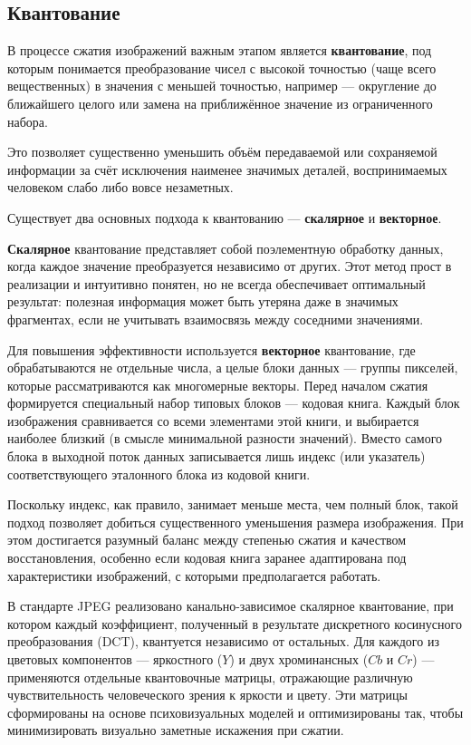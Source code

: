 \subsection{Квантование}

В процессе сжатия изображений важным этапом является \textbf{квантование}, 
под которым понимается преобразование чисел с высокой точностью (чаще всего вещественных) в значения с меньшей точностью, 
например — округление до ближайшего целого или замена на приближённое значение из ограниченного набора. 

Это позволяет существенно уменьшить объём передаваемой или сохраняемой информации за счёт исключения наименее значимых деталей, 
воспринимаемых человеком слабо либо вовсе незаметных.

Существует два основных подхода к квантованию — \textbf{скалярное} и \textbf{векторное}.

\textbf{Скалярное} квантование представляет собой поэлементную обработку данных, 
когда каждое значение преобразуется независимо от других. 
Этот метод прост в реализации и интуитивно понятен, но не всегда обеспечивает оптимальный результат: 
полезная информация может быть утеряна даже в значимых фрагментах, если не учитывать взаимосвязь между соседними значениями.

Для повышения эффективности используется \textbf{векторное} квантование, где обрабатываются не отдельные числа, 
а целые блоки данных — группы пикселей, которые рассматриваются как многомерные векторы. 
Перед началом сжатия формируется специальный набор типовых блоков — кодовая книга. 
Каждый блок изображения сравнивается со всеми элементами этой книги, и выбирается наиболее близкий (в смысле минимальной разности значений). 
Вместо самого блока в выходной поток данных записывается лишь индекс (или указатель) соответствующего эталонного блока из кодовой книги.

Поскольку индекс, как правило, занимает меньше места, чем полный блок, такой подход позволяет добиться существенного уменьшения размера изображения. 
При этом достигается разумный баланс между степенью сжатия и качеством восстановления, 
особенно если кодовая книга заранее адаптирована под характеристики изображений, с которыми предполагается работать.

В стандарте JPEG реализовано канально-зависимое скалярное квантование, при котором каждый коэффициент, 
полученный в результате дискретного косинусного преобразования (DCT), квантуется независимо от остальных. 
Для каждого из цветовых компонентов — яркостного ($Y$) и двух хроминансных ($Cb$ и $Cr$) — применяются отдельные квантовочные матрицы, 
отражающие различную чувствительность человеческого зрения к яркости и цвету. 
Эти матрицы сформированы на основе психовизуальных моделей и оптимизированы так, 
чтобы минимизировать визуально заметные искажения при сжатии.

